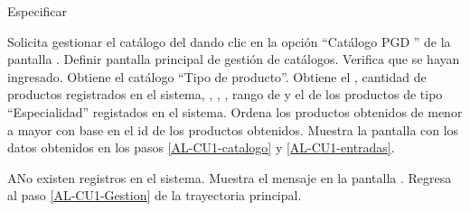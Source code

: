 \begin{UseCase}
{                                 %
        \Titem \TODO Especificar
    }
\end{UseCase}

\begin{UCtrayectoria}
    \UCpaso [\UCactor] Solicita gestionar el catálogo del  dando clic en la opción ``Catálogo PGD '' \hspace{0.1 cm} de la pantalla . \TODO Definir pantalla principal de gestión de catálogos.
    \UCpaso [\UCsist] Verifica que se hayan ingresado. 
    \UCpaso [\UCsist] \label{AL-CU1-catalogo} Obtiene el catálogo ``Tipo de producto''.
    \UCpaso [\UCsist] \label{AL-CU1-entradas} Obtiene el , cantidad de productos registrados en el sistema, , ,  , rango de  y el  de los productos de tipo ``Especialidad'' registados en el sistema. 
    \UCpaso [\UCsist] Ordena los productos obtenidos de menor a mayor con base en el id de los productos obtenidos.
    \UCpaso [\UCsist] Muestra la pantalla  con los datos obtenidos en los pasos \ref{AL-CU1-catalogo} y \ref{AL-CU1-entradas}. 

\end{UCtrayectoria}


\begin{UCtrayectoriaA}{A}{No existen registros en el sistema.}
    \UCpaso [\UCsist] Muestra el mensaje  en la pantalla .
    \UCpaso [\UCsist] Regresa al paso \ref{AL-CU1-Gestion} de la trayectoria principal.
\end{UCtrayectoriaA} 


